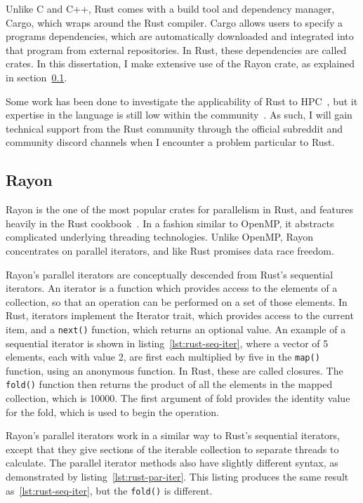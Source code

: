 Unlike C and C++, Rust comes with a build tool and dependency manager, Cargo, which wraps around the Rust compiler. Cargo allows users to specify a programs dependencies, which are automatically downloaded and integrated into that program from external repositories. In Rust, these dependencies are called crates. In this dissertation, I make extensive use of the Rayon crate, as explained in section~\ref{sec:back-rayon}.

Some work has been done to investigate the applicability of Rust to HPC~, but it expertise in the language is still low within the community~. As such, I will gain technical support from the Rust community through the official subreddit and community discord channels when I encounter a problem particular to Rust.

\subsection{Rayon}\label{sec:back-rayon}
Rayon is the one of the most popular crates for parallelism in Rust, and features heavily in the Rust cookbook~\cite{RustCookPara}. In a fashion similar to OpenMP, it abstracts complicated underlying threading technologies. Unlike OpenMP, Rayon concentrates on parallel iterators, and like Rust promises data race freedom.

Rayon's parallel iterators are conceptually descended from Rust's sequential iterators. An iterator is a function which provides access to the elements of a collection, so that an operation can be performed on a set of those elements. In Rust, iterators implement the Iterator trait, which provides access to the current item, and a \texttt{next()} function, which returns an optional value. An example of a sequential iterator is shown in listing~\ref{lst:rust-seq-iter}, where a vector of 5 elements, each with value 2, are first each multiplied by five in the \texttt{map()} function, using an anonymous function. In Rust, these are called closures. The \texttt{fold()} function then returns the product of all the elements in the mapped collection, which is 10000. The first argument of fold provides the identity value for the fold, which is used to begin the operation.

Rayon's parallel iterators work in a similar way to Rust's sequential iterators, except that they give sections of the iterable collection to separate threads to calculate. The parallel iterator methods also have slightly different syntax, as demonstrated by listing~\ref{lst:rust-par-iter}. This listing produces the same result as~\ref{lst:rust-seq-iter}, but the \texttt{fold()} is different.

